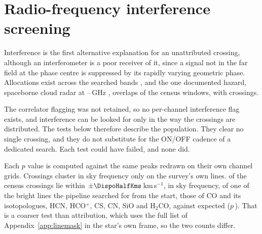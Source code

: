 \section{Radio-frequency interference screening}
\label{app:rfi}

Interference is the first alternative explanation for an unattributed
crossing, although an interferometer is a poor receiver of it, since a
signal not in the far field at the phase centre is suppressed by its rapidly
varying geometric phase. Allocations exist across the searched bands
\citep{ITU2024}, and the one documented hazard, spaceborne cloud radar at
\RadarLo--\RadarHi\,GHz \citep{CloudSat2002,EarthCARE2023,ALMAMemo504},
overlaps \RadarNWin{} of the \RadarNTot{} census windows, with \RadarNCross{}
crossings.

The correlator flagging was not retained, so no per-channel interference
flag exists, and interference can be looked for only in the way the
crossings are distributed. The tests below therefore describe the
population. They clear no single crossing, and they do not substitute for
the ON/OFF cadence of a dedicated search. Each test could have failed, and
none did.

Each $p$ value is computed against the same peaks redrawn on their own
channel grids. Crossings cluster in sky frequency only on the survey's own
lines. \NtTubeCenObs{} of the \CsNCross{} census crossings lie within
$\pm\DispoHalfKms$\,km\,s$^{-1}$, in sky frequency, of one of the bright
lines the pipeline searched for from the start, those of CO and its
isotopologues, HCN, HCO$^{+}$, CS, CN, SiO and H$_2$CO, against
\NtTubeCenNull{} expected ($p$\,\NtTubeCenP). That is a coarser test than attribution, which uses the
full list of Appendix~\ref{app:linemask} in the star's own frame, so the
two counts differ.

